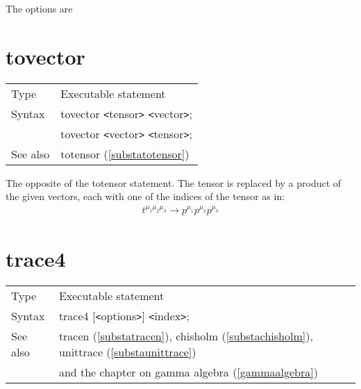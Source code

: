 \noindent The options are




\vspace{10mm}


\section{tovector}
\label{substatovector}

\noindent \begin{tabular}{ll}
Type & Executable statement\\
Syntax & tovector {\tt<}tensor{\tt>} {\tt<}vector{\tt>}; \\
       & tovector {\tt<}vector{\tt>} {\tt<}tensor{\tt>};
\\ See also & totensor (\ref{substatotensor})
\end{tabular} \vspace{4mm}

\noindent The opposite of the totensor 
statement. The tensor is replaced by a product of the given vectors, each 
with one of the indices of the tensor as in:
\begin{eqnarray}
    t^{\mu_1\mu_2\mu_3} \rightarrow p^{\mu_1}p^{\mu_2}p^{\mu_3} \nonumber
\end{eqnarray}\vspace{10mm}


\section{trace4}
\label{substatrace}

\noindent \begin{tabular}{ll}
Type & Executable statement\\
Syntax & trace4 [{\tt<}options{\tt>}] {\tt<}index{\tt>}; \\
See also & tracen (\ref{substatracen}), chisholm (\ref{substachisholm}),
    unittrace (\ref{substaunittrace}) \\ &
    and the chapter on gamma algebra (\ref{gammaalgebra})
\end{tabular} \vspace{4mm}

